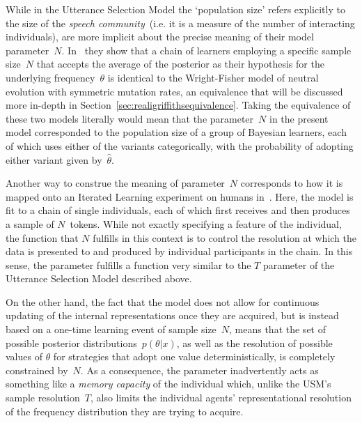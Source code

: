 While in the Utterance Selection Model the `population size' refers explicitly to the size of the \emph{speech community}~(i.e. it is a measure of the number of interacting individuals), \citeauthor{Reali2009} are more implicit about the precise meaning of their model parameter~$N$.
In~\citet{Reali2010} they show that a chain of learners employing a specific sample size~$N$ that accepts the average of the posterior as their hypothesis for the underlying frequency~$\theta$ is identical to the Wright-Fisher model of neutral evolution with symmetric mutation rates, an equivalence that will be discussed more in-depth in Section~\ref{sec:realigriffithsequivalence}.
Taking the equivalence of these two models literally would mean that the parameter~$N$ in the present model corresponded to the population size of a group of Bayesian learners, each of which uses either of the variants categorically, with the probability of adopting either variant given by~$\hat{\theta}$.

Another way to construe the meaning of parameter~$N$ corresponds to how it is mapped onto an Iterated Learning experiment on humans in~\citet{Reali2009}. Here, the model is fit to a chain of single individuals, each of which first receives and then produces a sample of $N$~tokens. While not exactly specifying a feature of the individual, the function that $N$ fulfills in this context is to control the resolution at which the data is presented to and produced by individual participants in the chain. In this sense, the parameter fulfills a function very similar to the $T$ parameter of the Utterance Selection Model described above.

On the other hand, the fact that the model does not allow for continuous updating of the internal representations once they are acquired, but is instead based on a one-time learning event of sample size~$N$, means that the set of possible posterior distributions~$p(\theta|x)$, as well as the resolution of possible values of $\theta$ for strategies that adopt one value deterministically, is completely constrained by~$N$. %
As a consequence, the parameter inadvertently acts as something like a \emph{memory capacity} of the individual which, unlike the USM's sample resolution~$T$, also limits the individual agents' representational resolution of the frequency distribution they are trying to acquire. %

